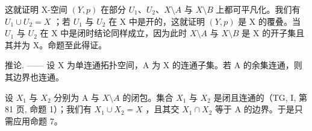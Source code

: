 这就证明 X-空间 \((Y,p)\) 在部分 \(U_{1}\)、\(U_{2}\)、\(X\setminus A\) 与 \(X\setminus B\) 上都可平凡化。我们有 \(U_{1} \cup U_{2} = X\) ；若 \(U_{1}\) 与 \(U_{2}\) 在 X 中是开的，这就证明 \((Y,p)\) 是 X 的覆叠。当 \(U_{1}\) 与 \(U_{2}\) 在 X 中是闭时结论同样成立，因为此时 \(X\setminus A\) 与 \(X\setminus B\) 是 X 的开子集且其并为 X。命题至此得证。

推论. —— 设 X 为单连通拓扑空间，A 为 X 的连通子集。若 A 的余集连通，则其边界也连通。

设 \(X_{1}\) 与 \(X_{2}\) 分别为 A 与 \(X\setminus A\) 的闭包。集合 \(X_{1}\) 与 \(X_{2}\) 是闭且连通的（TG, I, 第 81 页, 命题 1）；我们有 \(X_{1} \cup X_{2} = X\) ，且其交 \(X_{1} \cap X_{2}\) 等于 A 的边界。于是只需应用命题 7。
